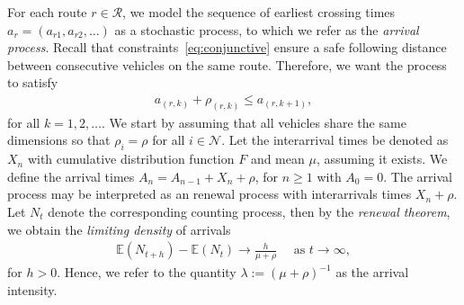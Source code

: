 \documentclass[a4paper]{article}
\theoremstyle{definition}
\theoremstyle{plain}
\begin{document}
For each route $r \in \mathcal{R}$, we model the sequence of earliest crossing times
$a_{r} = (a_{r1}, a_{r2}, \dots)$ as a stochastic process, to which we refer as
the \textit{arrival process}. Recall that constraints~\eqref{eq:conjunctive}
ensure a safe following distance between consecutive vehicles on the same route.
Therefore, we want the process to satisfy
\begin{align*}
  a_{(r, k)} + \rho_{(r,k)} \leq a_{(r, k + 1)} ,
\end{align*}
for all $k = 1, 2, \dots$. We start by assuming that all vehicles share the same
dimensions so that $\rho_{i} = \rho$ for all $i \in \mathcal{N}$.
%
Let the interarrival times be denoted as $X_{n}$ with cumulative distribution
function $F$ and mean $\mu$, assuming it exists. We define the arrival times
$A_{n} = A_{n-1} + X_{n} + \rho$, for $n \geq 1$ with $A_{0} = 0$.
%
The arrival process may be interpreted as an renewal process with interarrivals
times $X_{n} + \rho$.
%
%
Let $N_{t}$ denote the corresponding counting process, then by the \textit{renewal
  theorem}, we obtain the \textit{limiting density} of arrivals
%
\begin{align*}
  \mathbb{E}(N_{t + h}) - \mathbb{E}(N_{t}) \rightarrow \frac{h}{\mu + \rho} \quad \text{ as } t \rightarrow \infty ,
\end{align*}
for $h > 0$. Hence, we refer to the quantity $\lambda := {(\mu + \rho)}^{-1}$ as the
arrival intensity.

%
%
\end{document}
